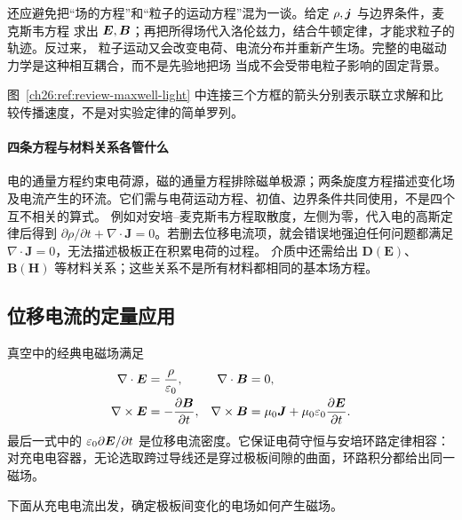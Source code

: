 {还应避免把“场的方程”和“粒子的运动方程”混为一谈。给定 $\rho,\bm{j}$ 与边界条件，麦克斯韦方程
求出 $\bm{E},\bm{B}$；再把所得场代入洛伦兹力，结合牛顿定律，才能求粒子的轨迹。反过来，
粒子运动又会改变电荷、电流分布并重新产生场。完整的电磁动力学是这种相互耦合，而不是先验地把场
当成不会受带电粒子影响的固定背景。

图~\ref{ch26:ref:review-maxwell-light} 中连接三个方框的箭头分别表示联立求解和比较传播速度，不是对实验定律的简单罗列。

\maxwellLightPanel


\paragraph{四条方程与材料关系各管什么}
电的通量方程约束电荷源，磁的通量方程排除磁单极源；两条旋度方程描述变化场及电流产生的环流。它们需与电荷运动方程、初值、边界条件共同使用，不是四个互不相关的算式。
例如对安培--麦克斯韦方程取散度，左侧为零，代入电的高斯定律后得到
$\partial\rho/\partial t+\nabla\cdot\boldsymbol J=0$。若删去位移电流项，就会错误地强迫任何问题都满足 $\nabla\cdot\boldsymbol J=0$，无法描述极板正在积累电荷的过程。
介质中还需给出 $\boldsymbol D(\boldsymbol E)$、$\boldsymbol B(\boldsymbol H)$ 等材料关系；这些关系不是所有材料都相同的基本场方程。


\subsection{位移电流的定量应用}


真空中的经典电磁场满足
\begin{align}
 \nabla\cdot\bm{E}&=\frac{\rho}{\varepsilon_0},&
 \nabla\cdot\bm{B}&=0,\\
 \nabla\times\bm{E}&=-\frac{\partial\bm{B}}{\partial t},&
 \nabla\times\bm{B}&=\mu_0\bm{J}+\mu_0\varepsilon_0
 \frac{\partial\bm{E}}{\partial t}.
\end{align}
最后一式中的 $\varepsilon_0\partial\bm{E}/\partial t$ 是位移电流密度。它保证电荷守恒与安培环路定律相容：
对充电电容器，无论选取跨过导线还是穿过极板间隙的曲面，环路积分都给出同一磁场。


下面从充电电流出发，确定极板间变化的电场如何产生磁场。

}
